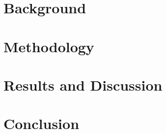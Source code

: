 \documentclass[a4paper,12pt,twoside,openright]{book}
\begin{document}
\chapter{Background}
\label{ch:background}

\clearpage

\chapter{Methodology}
\label{ch:methodology}

\clearpage

\chapter{Results and Discussion}
\label{ch:results_and_discussion}

\clearpage

\chapter{Conclusion}
\label{ch:conclusion}

\clearpage

\begin{appendices}
	\label{ch:appendices}
	
\end{appendices}
\nocite{*}



 
\end{document}
